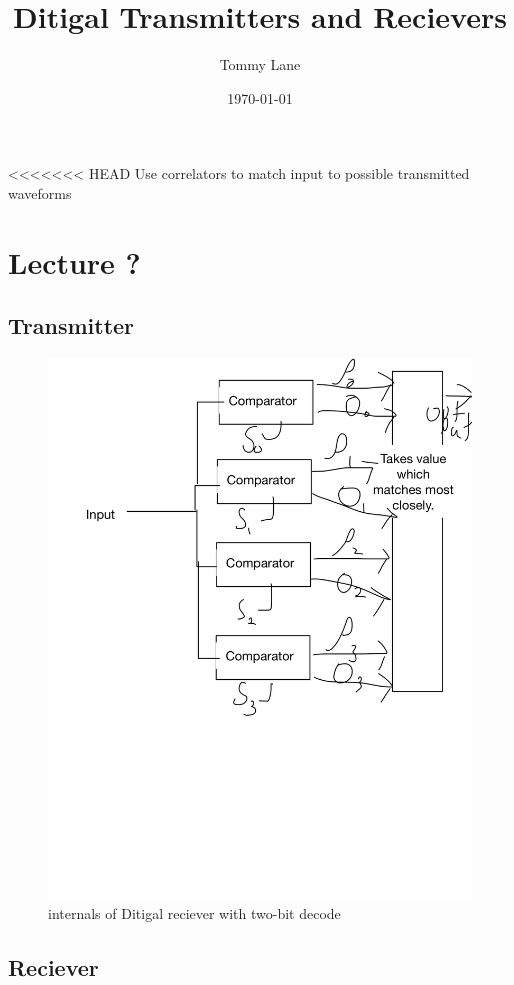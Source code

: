 \documentclass[11pt]{article}
\author{Tommy Lane}
\date{\today}
\title{Ditigal Transmitters and Recievers}
\begin{document}
\maketitle
\tableofcontents

<<<<<<< HEAD
Use correlators to match input to possible transmitted waveforms
\section{Lecture ?}
\label{sec-1}
\subsection{Transmitter}
\label{sec-1-1}
\begin{figure}[htb]
\centering
\includegraphics[width=.9\linewidth]{./img/Digital_reciever.png}
\caption{internals of Ditigal reciever with two-bit decode}
\end{figure}

\subsection{Reciever}
\label{sec-1-2}
\end{document}
